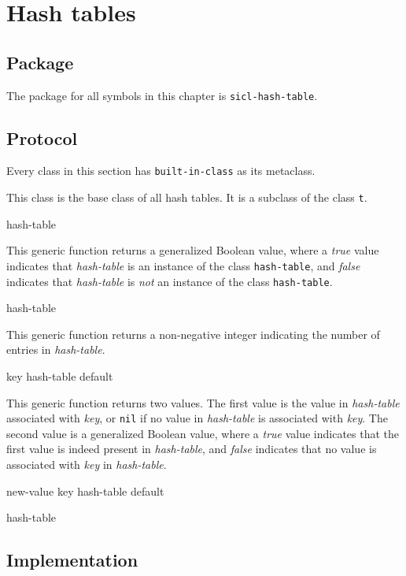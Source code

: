 \chapter{Hash tables}

\section{Package}

The package for all symbols in this chapter is \texttt{sicl-hash-table}.

\section{Protocol}

Every class in this section has \texttt{built-in-class} as its
metaclass.


This class is the base class of all hash tables.  It is a subclass of
the class \texttt{t}.


{\small{} {hash-table}
}

This generic function returns a generalized Boolean value, where a
\textsl{true} value indicates that \textit{hash-table} is an instance
of the class \texttt{hash-table}, and \textsl{false} indicates that
\textit{hash-table} is \emph{not} an instance of the class
\texttt{hash-table}.

{\small{} {hash-table}
}

This generic function returns a non-negative integer indicating the
number of entries in \textit{hash-table}.

{\small{} {key hash-table \optional default}
}

This generic function returns two values.  The first value is the
value in \textit{hash-table} associated with \textit{key}, or
\texttt{nil} if no value in \textit{hash-table} is associated with
\textit{key}.  The second value is a generalized Boolean value, where
a \textsl{true} value indicates that the first value is indeed present
in \textit{hash-table}, and \textsl{false} indicates that no value is
associated with \textit{key} in \textit{hash-table}.

{\small{} {new-value key hash-table \optional default}
}

{\small{} {hash-table}
}

\section{Implementation}

